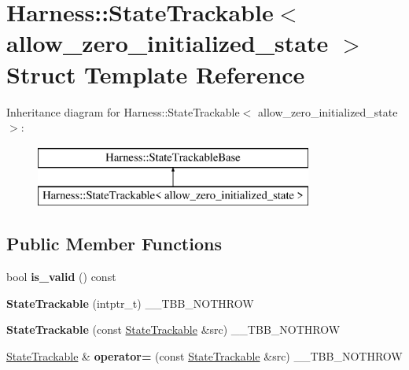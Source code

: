 \hypertarget{structHarness_1_1StateTrackable}{}\section{Harness\+:\+:State\+Trackable$<$ allow\+\_\+zero\+\_\+initialized\+\_\+state $>$ Struct Template Reference}
\label{structHarness_1_1StateTrackable}
Inheritance diagram for Harness\+:\+:State\+Trackable$<$ allow\+\_\+zero\+\_\+initialized\+\_\+state $>$\+:\begin{figure}[H]
\begin{center}
\leavevmode
\includegraphics[height=2.000000cm]{structHarness_1_1StateTrackable}
\end{center}
\end{figure}
\subsection*{Public Member Functions}
\begin{DoxyCompactItemize}
\item 
\hypertarget{structHarness_1_1StateTrackable_acd6de1c1fdcac6159643b229af2ee633}{}bool {\bfseries is\+\_\+valid} () const \label{structHarness_1_1StateTrackable_acd6de1c1fdcac6159643b229af2ee633}

\item 
\hypertarget{structHarness_1_1StateTrackable_a55706817a32b887bee891834458a1873}{}{\bfseries State\+Trackable} (intptr\+\_\+t) \+\_\+\+\_\+\+T\+B\+B\+\_\+\+N\+O\+T\+H\+R\+O\+W\label{structHarness_1_1StateTrackable_a55706817a32b887bee891834458a1873}

\item 
\hypertarget{structHarness_1_1StateTrackable_a56a08f00910dce6b0e0c12fcb3c32424}{}{\bfseries State\+Trackable} (const \hyperlink{structHarness_1_1StateTrackable}{State\+Trackable} \&src) \+\_\+\+\_\+\+T\+B\+B\+\_\+\+N\+O\+T\+H\+R\+O\+W\label{structHarness_1_1StateTrackable_a56a08f00910dce6b0e0c12fcb3c32424}

\item 
\hypertarget{structHarness_1_1StateTrackable_aa8a62cda408f63676bd90cf7a047bbf3}{}\hyperlink{structHarness_1_1StateTrackable}{State\+Trackable} \& {\bfseries operator=} (const \hyperlink{structHarness_1_1StateTrackable}{State\+Trackable} \&src) \+\_\+\+\_\+\+T\+B\+B\+\_\+\+N\+O\+T\+H\+R\+O\+W\label{structHarness_1_1StateTrackable_aa8a62cda408f63676bd90cf7a047bbf3}

\end{DoxyCompactItemize}
